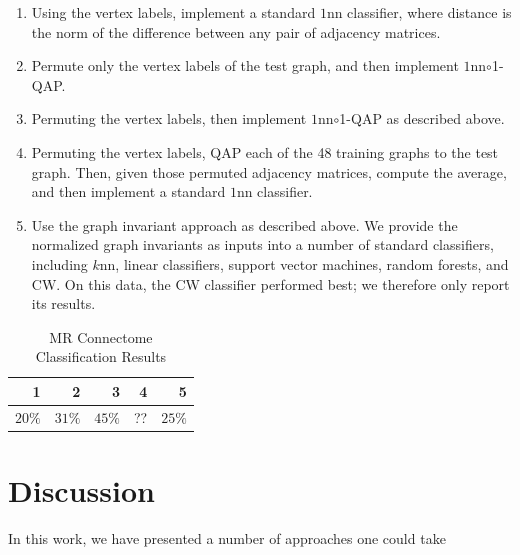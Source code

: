 \documentclass{article} %
\begin{document}
\begin{enumerate}
	\item Using the vertex labels, implement a standard $1$nn classifier, where distance is the norm of the difference between any pair of adjacency matrices.
	\item Permute only the vertex labels of the test graph, and then implement $1$nn$\circ$1-QAP.
	\item Permuting the vertex labels, then implement $1$nn$\circ$1-QAP as described above.
	\item Permuting the vertex labels, QAP each of the 48 training graphs to the test graph.  Then, given those permuted adjacency matrices, compute the average, and then implement a standard $1$nn classifier.
	\item Use the graph invariant approach as described above. We provide the normalized graph invariants as inputs into a number of standard classifiers, including $k$nn, linear classifiers, support vector machines, random forests, and CW. On this data, the CW classifier performed best; we therefore only report its results.
\end{enumerate}


\begin{table}[h!]
\caption{MR Connectome Classification Results}
\begin{center}
\begin{tabular}{|r|r|r|r|r|}
\hline
1 & 2  & 3 & 4 & 5\\
\hline
$20\%$ & $31\%$ & $45\%$ & ?? & $25\%$ \\
    \hline
\end{tabular}
\end{center}
\label{tab:fwpath}
\end{table}%


\section{Discussion}


In this work, we have presented a number of approaches one could take \cite{VogelsteinPaninski09}



% 
\end{document}
